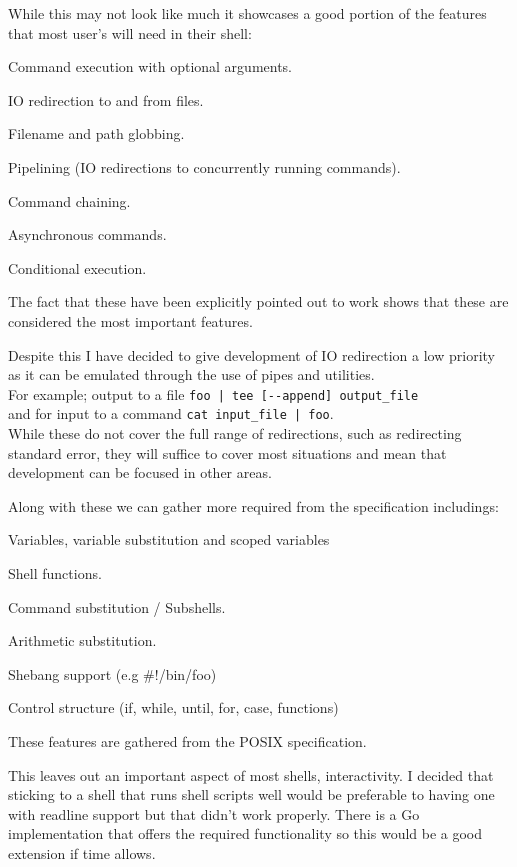 While this may not look like much it showcases a good portion of the features that most user's will need in their shell:
\begin{itemize*}
    \item Command execution with optional arguments.
    \item IO redirection to and from files.
    \item Filename and path globbing.
    \item Pipelining (IO redirections to concurrently running commands).
    \item Command chaining.
    \item Asynchronous commands.
    \item Conditional execution.
\end{itemize*}
The fact that these have been explicitly pointed out to work shows that these are considered the most important features.

Despite this I have decided to give development of IO redirection a low priority as it can be emulated through the use of pipes and utilities. \\
For example; output to a file \verb!foo | tee [--append] output_file! \\
and for input to a command \verb!cat input_file | foo!.\\
While these do not cover the full range of redirections, such as redirecting standard error, they will suffice to cover most situations and mean that development can be focused in other areas.

Along with these we can gather more required from the specification includings:
\begin{itemize*}
    \item Variables, variable substitution and scoped variables
    \item Shell functions.
    \item Command substitution / Subshells.
    \item Arithmetic substitution.
    \item Shebang support (e.g \#!/bin/foo)
    \item Control structure (if, while, until, for, case, functions)
\end{itemize*}

These features are gathered from the POSIX specification.

This leaves out an important aspect of most shells, interactivity.
I decided that sticking to a shell that runs shell scripts well would be preferable to having one with readline support but that didn't work properly. There is a Go implementation that offers the required functionality\cite{GO-READLINE} so this would be a good extension if time allows.

